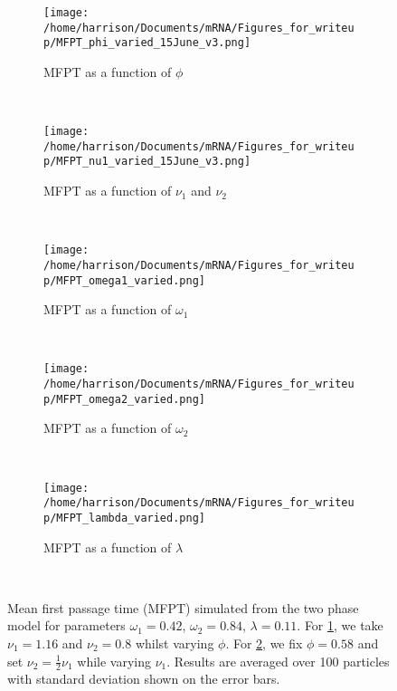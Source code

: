 \documentclass[twocolumn]{biophys}
\begin{document}
\begin{figure}
        \centering
        \begin{subfigure}[h]{0.95\columnwidth}
                \texttt{[image: /home/harrison/Documents/mRNA/Figures\_for\_writeup/MFPT\_phi\_varied\_15June\_v3.png]}
                \caption{MFPT as a function of $\phi$}
                \label{fig:phi}
        \end{subfigure}%
        
        
        ~ %
        \begin{subfigure}[h]{0.95\columnwidth}
                \texttt{[image: /home/harrison/Documents/mRNA/Figures\_for\_writeup/MFPT\_nu1\_varied\_15June\_v3.png]}
                \caption{MFPT as a function of $\nu_1$ and $\nu_2$}
                \label{fig:nu1}
        \end{subfigure}
         
         ~
         
         \begin{subfigure}[h]{0.95\columnwidth}
                \texttt{[image: /home/harrison/Documents/mRNA/Figures\_for\_writeup/MFPT\_omega1\_varied.png]}
                \caption{MFPT as a function of $\omega_1$}
                \label{fig:omega1}
        \end{subfigure}%
        
        ~ 
   
    \begin{subfigure}[h]{0.95\columnwidth}
                \texttt{[image: /home/harrison/Documents/mRNA/Figures\_for\_writeup/MFPT\_omega2\_varied.png]}
                \caption{MFPT as a function of $\omega_2$}
                \label{fig:omega2}
        \end{subfigure}%
        
        
        ~ 
        
         \begin{subfigure}[h]{0.95\columnwidth}
                \texttt{[image: /home/harrison/Documents/mRNA/Figures\_for\_writeup/MFPT\_lambda\_varied.png]}
                \caption{MFPT as a function of $\lambda$}
                \label{fig:lambda}
        \end{subfigure}%
        
        
        ~ 
        \caption{Mean first passage time (MFPT) simulated from the two phase model for parameters $\omega_1=0.42$, $\omega_2=0.84$, $\lambda=0.11$. For \ref{fig:phi}, we take $\nu_1=1.16$ and $\nu_2=0.8$ whilst varying $\phi$. 
        For \ref{fig:nu1}, we fix $\phi=0.58$ and set $\nu_2=\frac{1}{2}\nu_1$ while varying $\nu_1$. Results are averaged over 100 particles with standard deviation shown on the error bars.}
        \label{FIG:Sensitivity_analysis}
\end{figure}
\end{document}
